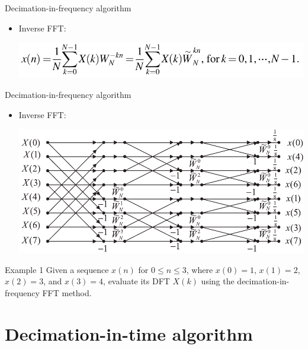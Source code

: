 \documentclass[pdflatex,compress,mathserif]{beamer}
\begin{document}
\begin{frame}{Decimation-in-frequency algorithm}
	\begin{itemize}
		\item Inverse FFT:
		\begin{center}
			\includegraphics[width=\linewidth]{img/img18}
		\end{center}
	\end{itemize}
\end{frame}

\begin{frame}{Decimation-in-frequency algorithm}
	\begin{itemize}
		\item Inverse FFT:
		\begin{center}
			\includegraphics[width=\linewidth]{img/img19}
		\end{center}
	\end{itemize}
\end{frame}

\begin{frame}{Example 1}
	Given a sequence $x(n)$ for $0 \leq n \leq 3$, where $x(0) = 1$, $x(1) = 2$, $x(2) = 3$, and $x(3) = 4$, evaluate its DFT $X(k)$ using the decimation-in-frequency FFT method.
\end{frame}

\section{Decimation-in-time algorithm}
\end{document}
